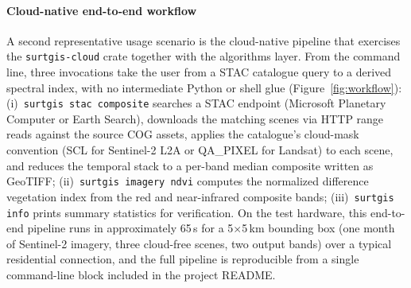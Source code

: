 \documentclass[preprint,review,12pt,authoryear]{elsarticle}
\begin{document}
\paragraph{Cloud-native end-to-end workflow} A second representative usage scenario is the cloud-native pipeline that exercises the \texttt{surtgis-cloud} crate together with the algorithms layer. From the command line, three invocations take the user from a STAC catalogue query to a derived spectral index, with no intermediate Python or shell glue (Figure~\ref{fig:workflow}): (i)~\texttt{surtgis stac composite} searches a STAC endpoint (Microsoft Planetary Computer or Earth Search), downloads the matching scenes via HTTP range reads against the source COG assets, applies the catalogue's cloud-mask convention (SCL for Sentinel-2 L2A or QA\_PIXEL for Landsat) to each scene, and reduces the temporal stack to a per-band median composite written as GeoTIFF; (ii)~\texttt{surtgis imagery ndvi} computes the normalized difference vegetation index from the red and near-infrared composite bands; (iii)~\texttt{surtgis info} prints summary statistics for verification. On the test hardware, this end-to-end pipeline runs in approximately 65\,s for a 5$\times$5\,km bounding box (one month of Sentinel-2 imagery, three cloud-free scenes, two output bands) over a typical residential connection, and the full pipeline is reproducible from a single command-line block included in the project README.
\end{document}

